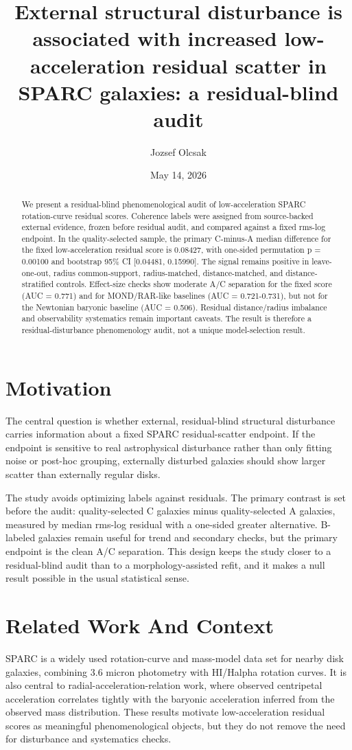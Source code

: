 \documentclass[11pt]{article}
\title{External structural disturbance is associated with increased low-acceleration residual scatter in SPARC galaxies: a residual-blind audit}
\author{Jozsef Olcsak}
\date{May 14, 2026}
\begin{document}
\maketitle
\begin{abstract}
We present a residual-blind phenomenological audit of low-acceleration SPARC rotation-curve residual scores. Coherence labels were assigned from source-backed external evidence, frozen before residual audit, and compared against a fixed rms-log endpoint. In the quality-selected sample, the primary C-minus-A median difference for the fixed low-acceleration residual score is 0.08427, with one-sided permutation p = 0.00100 and bootstrap 95\% CI [0.04481, 0.15990]. The signal remains positive in leave-one-out, radius common-support, radius-matched, distance-matched, and distance-stratified controls. Effect-size checks show moderate A/C separation for the fixed score (AUC = 0.771) and for MOND/RAR-like baselines (AUC = 0.721-0.731), but not for the Newtonian baryonic baseline (AUC = 0.506). Residual distance/radius imbalance and observability systematics remain important caveats. The result is therefore a residual-disturbance phenomenology audit, not a unique model-selection result.

\end{abstract}
\section{Motivation}
The central question is whether external, residual-blind structural disturbance carries information about a fixed SPARC residual-scatter endpoint. If the endpoint is sensitive to real astrophysical disturbance rather than only fitting noise or post-hoc grouping, externally disturbed galaxies should show larger scatter than externally regular disks.

The study avoids optimizing labels against residuals. The primary contrast is set before the audit: quality-selected C galaxies minus quality-selected A galaxies, measured by median rms-log residual with a one-sided greater alternative. B-labeled galaxies remain useful for trend and secondary checks, but the primary endpoint is the clean A/C separation. This design keeps the study closer to a residual-blind audit than to a morphology-assisted refit, and it makes a null result possible in the usual statistical sense.

\section{Related Work And Context}
SPARC is a widely used rotation-curve and mass-model data set for nearby disk galaxies, combining 3.6 micron photometry with HI/Halpha rotation curves. It is also central to radial-acceleration-relation work, where observed centripetal acceleration correlates tightly with the baryonic acceleration inferred from the observed mass distribution. These results motivate low-acceleration residual scores as meaningful phenomenological objects, but they do not remove the need for disturbance and systematics checks.
\end{document}
